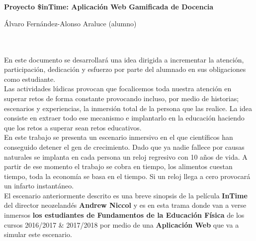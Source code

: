\chapter*{}






\cleardoublepage
\thispagestyle{empty}

\begin{center}
{\large\bfseries Proyecto \$inTime: Aplicación Web Gamificada de Docencia }\\
\end{center}
\begin{center}
Álvaro Fernández-Alonso Araluce (alumno)\\
\end{center}

\\

\vspace{0.7cm}
\\

En este documento se desarrollará una idea dirigida a incrementar la atención, participación, dedicación y esfuerzo por parte del alumnado en sus obligaciones como estudiante.\\

Las actividades lúdicas provocan que focalicemos toda nuestra atención en superar retos de forma constante provocando incluso, por medio de historias; escenarios y experiencias, la inmersión total de la persona que las realice. La idea consiste en extraer todo ese mecanismo e implantarlo en la educación haciendo que los retos a superar sean retos educativos.\\

En este trabajo se presenta un escenario inmersivo en el que científicos han conseguido detener el gen de crecimiento. Dado que ya nadie fallece por causas naturales se implanta en cada persona un reloj regresivo con 10 años de vida. A partir de ese momento el trabajo se cobra en tiempo, los alimentos cuestan tiempo, toda la economía se basa en el tiempo. Si un reloj llega a cero provocará un infarto instantáneo.\\

El escenario anteriormente descrito es una breve sinopsis de la película \textbf{InTime} del director neozelandés \textbf{Andrew Niccol} y es en esta trama donde van a verse inmersos \textbf{los estudiantes de Fundamentos de la Educación Física} de los cursos 2016/2017 \& 2017/2018 por medio de una \textbf{Aplicación Web} que va a simular este escenario.\\

